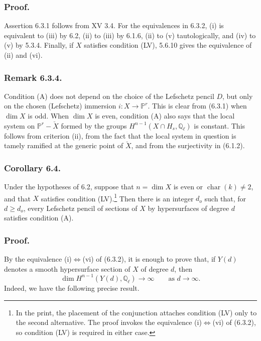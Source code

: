 \subsubsection*{Proof.}
Assertion 6.3.1 follows from XV 3.4.  For the equivalences in 6.3.2,
(i) is equivalent to (iii) by 6.2, (ii) to (iii) by 6.1.6, (ii) to (v)
tautologically, and (iv) to (v) by 5.3.4.  Finally, if $X$ satisfies
condition (LV), 5.6.10 gives the equivalence of (ii) and (vi).

\subsubsection*{Remark 6.3.4.}
Condition (A) does not depend on the choice of the Lefschetz pencil
$D$, but only on the chosen (Lefschetz) immersion
$i:X\longrightarrow\mathbb P^r$.  This is clear from (6.3.1) when
$\dim X$ is odd.  When $\dim X$ is even, condition (A) also says that
the local system on $\mathbb P^r-\check X$ formed by the groups
$H^{n-1}(X\cap H_s,\mathbb Q_\ell)$ is constant.  This follows from
criterion (ii), from the fact that the local system in question is
tamely ramified at the generic point of $\check X$, and from the
surjectivity in (6.1.2).

\subsubsection*{Corollary 6.4.}
Under the hypotheses of 6.2, suppose that
$n=\dim X$ is even or $\operatorname{char}(k)\ne2$, and that $X$
satisfies condition (LV).\footnote{In the print, the placement of the
conjunction attaches condition (LV) only to the second alternative.
The proof invokes the equivalence (i)$\Longleftrightarrow$(vi) of
(6.3.2), so condition (LV) is required in either case.}
Then there is an integer $d_o$ such that, for $d\ge d_o$, every
Lefschetz pencil of sections of $X$ by hypersurfaces of degree $d$
satisfies condition (A).

\subsubsection*{Proof.}
By the equivalence (i)$\Longleftrightarrow$(vi) of (6.3.2), it is
enough to prove that, if $Y(d)$ denotes a smooth hypersurface section of
$X$ of degree $d$, then
\begin{equation}\tag{6.4.1}
\dim H^{n-1}(Y(d),\mathbb Q_\ell)\longrightarrow\infty
\qquad\text{as }d\longrightarrow\infty.
\end{equation}
Indeed, we have the following precise result.

